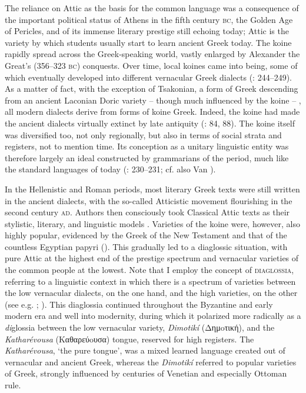 The reliance on Attic as the basis for the common language was a consequence of the important political status of Athens in the fifth century \textsc{bc}, the Golden Age of Pericles, and of its immense literary prestige still echoing today; Attic is the variety by which students usually start to learn ancient Greek today. The koine rapidly spread across the Greek-speaking world, vastly enlarged by Alexander the Great’s (356–323 \textsc{bc}) conquests. Over time, local koines came into being, some of which eventually developed into different vernacular Greek dialects (\citealt{Brixhe2010}: 244–249). As a matter of fact, with the exception of Tsakonian, a form of Greek descending from an ancient Laconian Doric variety – though much influenced by the koine – \citep[88]{Horrocks2010}, all modern dialects derive from forms of koine Greek. Indeed, the koine had made the ancient dialects virtually extinct by late antiquity (\citealt{Horrocks2010}: 84, 88). The koine itself was diversified too, not only regionally, but also in terms of social strata and registers, not to mention time. Its conception as a unitary linguistic entity was therefore largely an ideal constructed by grammarians of the period, much like the standard languages of today (\citealt{Brixhe2010}: 230–231; cf. also Van \citealt{Rooy2016b}).

In the Hellenistic and Roman periods, most literary Greek texts were still written in the ancient dialects, with the so-called Atticistic movement flourishing in the second century \textsc{ad}. Authors then consciously took Classical Attic texts as their stylistic, literary, and linguistic models \citep[42]{Whitmarsh2005}. Varieties of the koine were, however, also highly popular, evidenced by the Greek of the New Testament and that of the countless Egyptian papyri (\citealt{EvansObbink2010}). This gradually led to a diaglossic situation, with pure Attic at the highest end of the prestige spectrum and vernacular varieties of the common people at the lowest. Note that I employ the concept of \textsc{diaglossia}, referring to a linguistic context in which there is a spectrum of varieties between the low vernacular dialects, on the one hand, and the high varieties, on the other (see e.g. \citealt{Auer2005}; \citealt{Rutten2016}). This diaglossia continued throughout the Byzantine and early modern era and well into modernity, during which it polarized more radically as a \textit{di}glossia between the low vernacular variety, \textit{Dimotikí} (Δημoτική), and the \textit{Katharévousa} (Kαθαρεύoυσα) tongue, reserved for high registers. The \textit{Katharévousa}, ‘the pure tongue’, was a mixed learned language created out of vernacular and ancient Greek, whereas the \textit{Dimotikí} referred to popular varieties of Greek, strongly influenced by centuries of Venetian and especially Ottoman rule.

